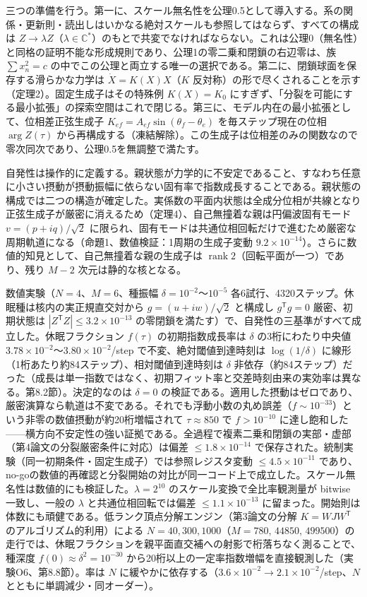 \documentclass[
  a4paper,
]{ltjsarticle}
\begin{document}
三つの準備を行う。第一に、スケール無名性を公理0.5として導入する。系の関係・更新則・読出しはいかなる絶対スケールも参照してはならず、すべての構成は
\(Z\to\lambda Z\)（\(\lambda\in\mathbb C^\ast\)）のもとで共変でなければならない。これは公理0（無名性）と同格の証明不能な形成規則であり、公理1の零二乗和閉鎖の右辺零は、族
\(\sum x_n^2=c\)
の中でこの公理と両立する唯一の選択である。第二に、閉鎖球面を保存する滑らかな力学は
\(\dot X=K(X)X\)（\(K\)
反対称）の形で尽くされることを示す（定理2）。固定生成子はその特殊例
\(K(X)=K_0\)
にすぎず、「分裂を可能にする最小拡張」の探索空間はこれで閉じる。第三に、モデル内在の最小拡張として、位相差正弦生成子
\(K_{ef}=A_{ef}\sin(\theta_f-\theta_e)\) を毎ステップ現在の位相
\(\arg Z(\tau)\)
から再構成する（凍結解除）。この生成子は位相差のみの関数なので零次同次であり、公理0.5を無調整で満たす。

自発性は操作的に定義する。親状態が力学的に不安定であること、すなわち任意に小さい摂動が摂動振幅に依らない固有率で指数成長することである。親状態の構成では二つの構造が確定した。実係数の平面内状態は全成分位相が共線となり正弦生成子が厳密に消えるため（定理4）、自己無撞着な親は円偏波固有モード
\(v=(p+iq)/\sqrt2\)
に限られ、固有モードは共通位相回転だけで進むため厳密な周期軌道になる（命題1、数値検証：1周期の生成子変動
\(9.2\times10^{-14}\)）。さらに数値的知見として、自己無撞着な親の生成子は
\(\operatorname{rank}2\)（回転平面が一つ）であり、残り \(M-2\)
次元は静的な核となる。

数値実験（\(N=4\)、\(M=6\)、種振幅 \(\delta=10^{-2}\)〜\(10^{-5}\)
各6試行、4320ステップ。休眠種は核内の実正規直交対から
\(g=(u+iw)/\sqrt2\) と構成し \(g^{\mathsf T}g=0\) 厳密、初期状態は
\(|Z^{\mathsf T}Z|\le3.2\times10^{-13}\)
の零閉鎖を満たす）で、自発性の三基準がすべて成立した。休眠フラクション
\(f(\tau)\) の初期指数成長率は \(\delta\) の3桁にわたり中央値
\(3.78\times10^{-2}\)〜\(3.80\times10^{-2}\)/step
で不変、絶対閾値到達時刻は \(\log(1/\delta)\)
に線形（1桁あたり約84ステップ）、相対閾値到達時刻は \(\delta\)
非依存（約84ステップ）だった（成長は単一指数ではなく、初期フィット率と交差時刻由来の実効率は異なる。第8.2節）。決定的なのは
\(\delta=0\)
の検証である。適用した摂動はゼロであり、厳密演算なら軌道は不変である。それでも浮動小数の丸め誤差（\(f\sim10^{-33}\)）という非零の数値摂動が約20桁増幅されて
\(\tau\approx850\) で \(f>10^{-10}\)
に達し飽和した------横方向不安定性の強い証拠である。全過程で複素二乗和閉鎖の実部・虚部（第4論文の分裂厳密条件に対応）は偏差
\(\le1.8\times10^{-14}\)
で保存された。統制実験（同一初期条件・固定生成子）では参照レジスタ変動
\(\le4.5\times10^{-11}\)
であり、no-goの数値的再確認と分裂開始の対比が同一コード上で成立した。スケール無名性は数値的にも検証した。\(\lambda=2^{10}\)
のスケール変換で全比率観測量が bitwise 一致し、一般の \(\lambda\)
と共通位相回転では偏差 \(\le1.1\times10^{-13}\)
に留まった。開始則は体数にも頑健である。低ランク頂点分解エンジン（第3論文の分解
\(K=WJW^{\mathsf T}\) のアルゴリズム的利用）による
\(N=40,300,1000\)（\(M=780,\,44850,\,499500\)）の走行では、休眠フラクションを親平面直交補への射影で桁落ちなく測ることで、種深度
\(f(0)\approx\delta^2=10^{-30}\)
から20桁以上の一定率指数増幅を直接観測した（実験O6、第8.8節）。率は
\(N\)
に緩やかに依存する（\(3.6\times10^{-2}\to2.1\times10^{-2}\)/step、\(N\)
とともに単調減少・同オーダー）。
\end{document}

